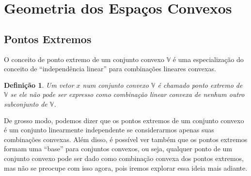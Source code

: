 \newtheorem{def:ponto extremo}[def:conjunto convexo]{Definição}

\newtheorem{def:raio}[def:conjunto convexo]{Definição}

\newtheorem{def:direção}[def:conjunto convexo]{Definição}

\newtheorem{def:direção extrema}[def:conjunto convexo]{Definição}

\newtheorem{def:ponto degenerado}[def:conjunto convexo]{Definição}

\newtheorem{def:face}[def:conjunto convexo]{Definição}


\newtheorem{prop:combinação convexa}{Proposição}[chapter]

\newtheorem{prop:hiperplano e ponto extremo}[prop:combinação convexa]{Proposição}

\newtheorem{prop:direção}[prop:combinação convexa]{Proposição}

\newtheorem{prop:aresta}[prop:combinação convexa]{Proposição}


\newtheorem{thm:ponto extremo}{Teorema}[chapter]

\section{Geometria dos Espaços Convexos}

\subsection{Pontos Extremos}

O conceito de ponto extremo de um conjunto convexo $\mathbb{V}$ é uma especialização do conceito de ``independência linear'' para combinações lineares convexas.

\begin{def:ponto extremo}
	Um vetor $x$ num conjunto convexo $\mathbb{V}$ é chamado ponto extremo de $\mathbb{V}$ se ele não pode ser expresso como combinação linear convexa de nenhum outro subconjunto de $\mathbb{V}$. 
\end{def:ponto extremo}

De grosso modo, podemos dizer que os pontos extremos de um conjunto convexo é um conjunto linearmente independente se considerarmos apenas suas combinações convexas. Além disso, é possível ver também que os pontos extremos formam uma ``base'' para conjuntos convexos, ou seja, qualquer ponto de um conjunto convexo pode ser dado como combinação convexa dos pontos extremos, mas não se preocupe com isso agora, pois iremos explorar essa ideia mais adiante.

